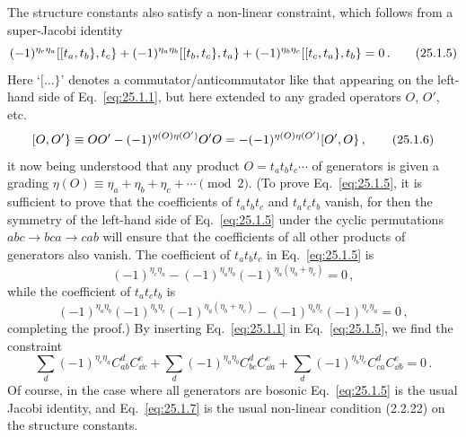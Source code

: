 The structure constants also satisfy a non-linear constraint, which follows
from a super-Jacobi identity
\begin{equation}
  (-1)^{\eta_c\eta_a}
    \mathopen{[}\mathopen{[}t_a,t_b\mathclose{\}},t_c\mathclose{\}}
  +(-1)^{\eta_a\eta_b}
    \mathopen{[}\mathopen{[}t_b,t_c\mathclose{\}},t_a\mathclose{\}}
  +(-1)^{\eta_b\eta_c}
    \mathopen{[}\mathopen{[}t_c,t_a\mathclose{\}},t_b\mathclose{\}}
  =0\,.
  \tag{25.1.5}\label{eq:25.1.5}
\end{equation}
Here `$[\ldots\}$' denotes a commutator/anticommutator like that appearing on
the left-hand side of Eq.~\eqref{eq:25.1.1}, but here extended to any graded
operators $O$, $O'$, etc.
\begin{equation}
  \mathopen{[}O,O'\mathclose{\}}
  \equiv OO'-(-1)^{\eta(O)\eta(O')}O'O
  =-(-1)^{\eta(O)\eta(O')}\mathopen{[}O',O\mathclose{\}}\,,
  \tag{25.1.6}\label{eq:25.1.6}
\end{equation}
it now being understood that any product $O=t_at_bt_c\cdots$ of generators is
given a grading
$\eta(O)\equiv\eta_a+\eta_b+\eta_c+\cdots\pmod 2$. (To prove
Eq.~\eqref{eq:25.1.5}, it is sufficient to prove that the coefficients of
$t_at_bt_c$ and $t_at_ct_b$ vanish, for then the symmetry of the left-hand
side of Eq.~\eqref{eq:25.1.5} under the cyclic permutations
$abc\longrightarrow bca\longrightarrow cab$ will ensure that the coefficients
of all other products of generators also vanish. The coefficient of
$t_at_bt_c$ in Eq.~\eqref{eq:25.1.5} is
\[
  (-1)^{\eta_c\eta_a}
  -(-1)^{\eta_a\eta_b}(-1)^{\eta_a(\eta_b+\eta_c)}
  =0\,,
\]
while the coefficient of $t_at_ct_b$ is
\[
  (-1)^{\eta_a\eta_b}(-1)^{\eta_b\eta_c}
    (-1)^{\eta_a(\eta_b+\eta_c)}
  -(-1)^{\eta_b\eta_c}(-1)^{\eta_c\eta_a}
  =0\,,
\]
completing the proof.) By inserting Eq.~\eqref{eq:25.1.1} in
Eq.~\eqref{eq:25.1.5}, we find the constraint
\begin{equation}
  \sum_d(-1)^{\eta_c\eta_a}C^d_{ab}C^e_{\dd c}
  +\sum_d(-1)^{\eta_a\eta_b}C^d_{bc}C^e_{\dd a}
  +\sum_d(-1)^{\eta_b\eta_c}C^d_{ca}C^e_{\dd b}
  =0\,.
  \tag{25.1.7}\label{eq:25.1.7}
\end{equation}
Of course, in the case where all generators are bosonic
Eq.~\eqref{eq:25.1.5} is the usual Jacobi identity, and
Eq.~\eqref{eq:25.1.7} is the usual non-linear condition (2.2.22) on the
structure constants.

